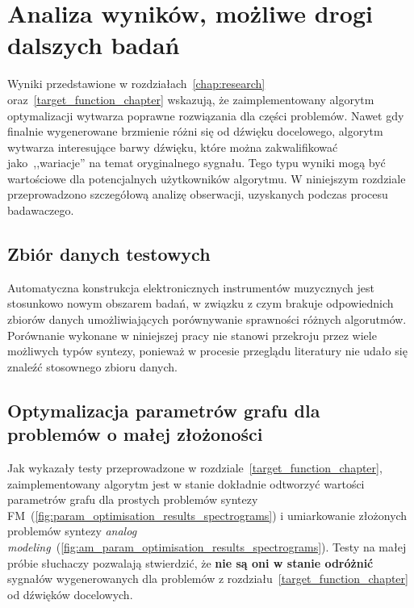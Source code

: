 \chapter{Analiza wyników, możliwe drogi dalszych badań}\label{chap:results_analysis}



Wyniki przedstawione w rozdziałach~\ref{chap:research} oraz~\ref{target_function_chapter}
wskazują, że zaimplementowany algorytm optymalizacji wytwarza poprawne rozwiązania
dla części problemów. Nawet gdy finalnie wygenerowane brzmienie różni
się od dźwięku docelowego, algorytm wytwarza interesujące barwy dźwięku,
które można zakwalifikować jako~,,wariacje'' na temat oryginalnego sygnału.
Tego typu wyniki mogą być wartościowe dla potencjalnych użytkowników algorytmu.
W niniejszym rozdziale przeprowadzono szczegółową analizę obserwacji,
uzyskanych podczas procesu badawaczego.


\section{Zbiór danych testowych}\label{sec:not_enough_benchmarking_data}

Automatyczna konstrukcja elektronicznych instrumentów muzycznych jest stosunkowo
nowym obszarem badań, w związku z czym brakuje odpowiednich zbiorów danych
umożliwiających porównywanie sprawności różnych algorutmów.
Porównanie wykonane w niniejszej pracy nie stanowi przekroju
przez wiele możliwych typów syntezy, ponieważ w procesie przeglądu
literatury nie udało się znaleźć stosownego zbioru danych.



\section{Optymalizacja parametrów grafu dla problemów o małej złożoności}

Jak wykazały testy przeprowadzone w rozdziale~\ref{target_function_chapter},
zaimplementowany algorytm jest w stanie dokładnie odtworzyć wartości
parametrów grafu dla prostych problemów syntezy
FM~(\ref{fig:param_optimisation_results_spectrograms})
i umiarkowanie złożonych problemów syntezy
\textit{analog modeling}~(\ref{fig:am_param_optimisation_results_spectrograms}).
Testy na małej próbie słuchaczy pozwalają stwierdzić,
że \textbf{nie są oni w stanie odróżnić} sygnałów wygenerowanych
dla problemów z rozdziału~\ref{target_function_chapter}
od dźwięków docelowych.

